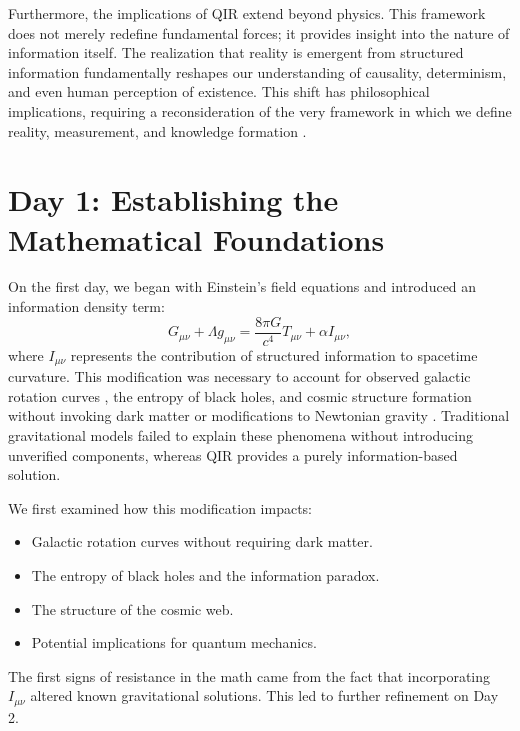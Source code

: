 \documentclass{article}
\begin{document}
Furthermore, the implications of QIR extend beyond physics. This framework does not merely redefine fundamental forces; it provides insight into the nature of information itself. The realization that reality is emergent from structured information fundamentally reshapes our understanding of causality, determinism, and even human perception of existence. This shift has philosophical implications, requiring a reconsideration of the very framework in which we define reality, measurement, and knowledge formation \cite{wheeleritfrombit}.

\section{Day 1: Establishing the Mathematical Foundations}
On the first day, we began with Einstein’s field equations \cite{einstein} and introduced an information density term:
\begin{equation}
    G_{\mu\nu} + \Lambda g_{\mu\nu} = \frac{8 \pi G}{c^4} T_{\mu\nu} + \alpha I_{\mu\nu},
\end{equation}
where $I_{\mu\nu}$ represents the contribution of structured information to spacetime curvature. This modification was necessary to account for observed galactic rotation curves \cite{sparc}, the entropy of black holes, and cosmic structure formation without invoking dark matter or modifications to Newtonian gravity \cite{verlindegravity, bekensteinentropy}. Traditional gravitational models failed to explain these phenomena without introducing unverified components, whereas QIR provides a purely information-based solution.

We first examined how this modification impacts:
\begin{itemize}
    \item Galactic rotation curves without requiring dark matter.
    \item The entropy of black holes and the information paradox.
    \item The structure of the cosmic web.
    \item Potential implications for quantum mechanics.
\end{itemize}
The first signs of resistance in the math came from the fact that incorporating $I_{\mu\nu}$ altered known gravitational solutions. This led to further refinement on Day 2.
\end{document}
